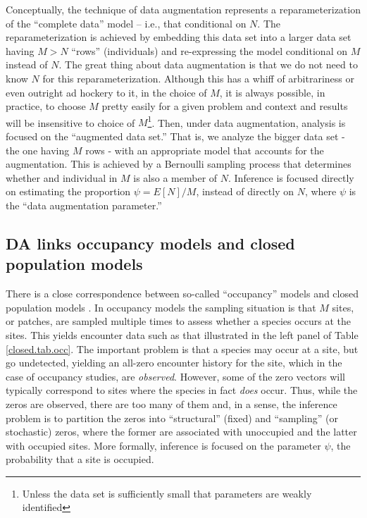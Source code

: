 Conceptually, the technique of data augmentation represents  a reparameterization of the
``complete data'' model -- i.e., that conditional on $N$. The
reparameterization is achieved by embedding this data set into a
larger data set having $M> N$ ``rows'' (individuals) and re-expressing
the model conditional on $M$ instead of $N$. The great thing about
data augmentation is that we do not need to know $N$ for this reparameterization.
Although this has a whiff of
arbitrariness or even outright ad hockery to it, in the choice of $M$,
it is always possible, in practice, to choose $M$ pretty easily for
a given problem and context and results will be insensitive to choice
of $M$\footnote{Unless the data set is sufficiently small that parameters are
weakly identified}.
Then, under data augmentation, analysis
is focused on the ``augmented data set.'' That is, we analyze the bigger
data set - the one having $M$ rows - with an appropriate model that
accounts for the augmentation. This is achieved by a Bernoulli sampling process that determines whether and individual in $M$ is also a member of $N$.
Inference is focused directly on
estimating the proportion $\psi = E[N]/M$, instead of directly on $N$,
where $\psi$ is the ``data augmentation parameter.''


\subsection{DA links occupancy models and closed population models}

There is a close correspondence between so-called ``occupancy'' models and closed
population models \citet[see][sec. 5.6]{royle_dorazio:2008}.
In occupancy models \citep{mackenzie_etal:2002, tyre_etal:2003} the
sampling situation is that $M$ sites, or patches, are sampled multiple
times to assess whether a species occurs at the sites.  This yields
encounter data such as that illustrated in the left panel of Table
\ref{closed.tab.occ}. The important problem is that a species may
occur at a site, but go undetected, yielding an all-zero encounter
history for the site, which in the case of occupancy studies, are {\it
  observed}. However, some of the zero vectors will typically correspond
to sites where the species in fact {\it does} occur. Thus, while the
zeros are observed, there are too many of them and, in a sense, the
inference problem is to partition the zeros into ``structural''
(fixed) and ``sampling'' (or stochastic) zeros, where the former are
associated with unoccupied and the latter with occupied sites. More
formally, inference is focused on the parameter $\psi$, the
probability that a site is occupied.

